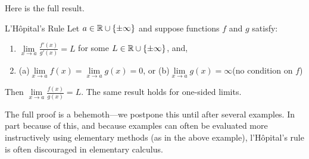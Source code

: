 Here is the full result.

\begin{thm}{L'Hôpital's Rule}{}
	Let $a\in\mathbb{R}\cup\{\pm\infty\}$ and suppose functions $f$ and $g$ satisfy:
	\begin{enumerate}
	  \item $\lim\limits_{x\to a}\frac{f'(x)}{g'(x)}=L$ for some $L\in\mathbb{R}\cup\{\pm\infty\}$, \space and,
	  \item (a)\space\space $\lim\limits_{x\to a}f(x)=\lim\limits_{x\to a} g(x)=0$,
	  \quad or\quad 
	  (b)\space\space $\lim\limits_{x\to a}g(x)=\infty$\space\space (no condition on $f$)
	\end{enumerate}
	Then $\lim\limits_{x\to a}\frac{f(x)}{g(x)}=L$. The same result holds for one-sided limits.
\end{thm}

The full proof is a behemoth---we postpone this until after several examples. In part because of this, and because examples can often be  evaluated more instructively using elementary methods (as in the above example), l'Hôpital's rule is often discouraged in elementary calculus.


\goodbreak


